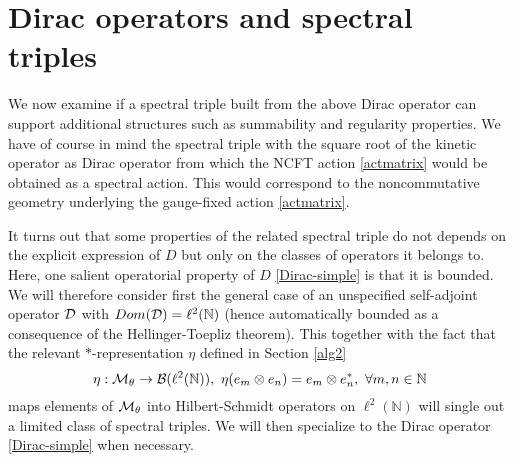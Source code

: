 \documentclass[a4paper]{jpconf}
\numberwithin{equation}{section}
\theoremstyle{nonumberplain}
\begin{document}

\section{Dirac operators and spectral triples}\label{ncg}
We now examine if a spectral triple built from the above Dirac operator can support additional structures such as summability and regularity properties. We have of course in mind the spectral triple with the square root of the kinetic operator as Dirac operator from which the NCFT action \eqref{actmatrix} would be obtained as a spectral action. This would correspond to the noncommutative geometry underlying the gauge-fixed action \eqref{actmatrix}.\par 

It turns out that some properties of the related spectral triple do not depends on the explicit expression of $D$ but only on the classes of operators it belongs to. Here, one salient operatorial property of $D$ \eqref{Dirac-simple} is that it is bounded. We will therefore consider first the general case of an unspecified self-adjoint operator ${\cal{D}}$ with $Dom({\cal{D}})=\ell^2(\mathbb{N})$ (hence automatically bounded as a consequence of the Hellinger-Toepliz theorem). This together with the fact that the relevant $*$-representation $\eta$ defined in Section \ref{alg2} 
\begin{equation}
\eta:{\cal{M}}_\theta\to{\cal{B}}(\ell^2(\mathbb{N})),\ \eta(e_m\otimes e_n)=e_m\otimes e^*_n,\ \forall m,n\in\mathbb{N}\label{Left-representation}
\end{equation}
maps elements of ${\cal{M}}_\theta$ into Hilbert-Schmidt operators on $\ell^2(\mathbb{N})$ will single out a limited class of spectral triples. We will then specialize to the Dirac operator \eqref{Dirac-simple} when necessary.\par
\end{document}
